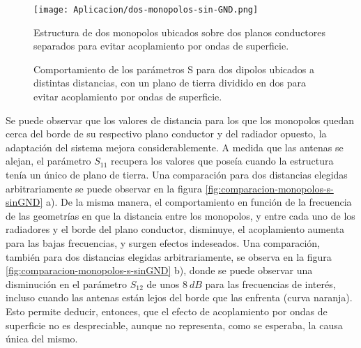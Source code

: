\begin{figure}[h]
	\centering
	\texttt{[image: Aplicacion/dos-monopolos-sin-GND.png]}
	\caption{Estructura de dos monopolos ubicados sobre dos planos conductores separados para evitar acoplamiento por ondas de superficie.}
	\label{fig:monopolos-sin-plano-de-tierra-geometria}
\end{figure}

\begin{figure}[h]
	\centering 
	\hspace{0pt}
	\caption{Comportamiento de los parámetros S para dos dipolos ubicados a distintas distancias, con un plano de tierra dividido en dos para evitar acoplamiento por ondas de superficie.}
	\label{fig:monopolos-sin-plano-de-tierra-resultados}	
\end{figure}  

Se puede observar que los valores de distancia para los que los monopolos quedan cerca del borde de su respectivo plano conductor y del radiador opuesto, la adaptación del sistema mejora considerablemente. A medida que las antenas se alejan, el parámetro $S_{11}$ recupera los valores que poseía cuando la estructura tenía un único de plano de tierra. Una comparación para dos distancias elegidas arbitrariamente se puede observar en la figura \ref{fig:comparacion-monopolos-s-sinGND} a). De la misma manera, el comportamiento en función de la frecuencia de las geometrías en que la distancia entre los monopolos, y entre cada uno de los radiadores y el borde del plano conductor, disminuye, el acoplamiento aumenta para las bajas frecuencias, y surgen efectos indeseados. Una comparación, también para dos distancias elegidas arbitrariamente, se observa en la figura \ref{fig:comparacion-monopolos-s-sinGND} b), donde se puede observar una disminución en el parámetro $S_{12}$ de unos $8\ dB$ para las frecuencias de interés, incluso cuando las antenas están lejos del borde que las enfrenta (curva naranja). Esto permite deducir, entonces, que el efecto de acoplamiento por ondas de superficie no es despreciable, aunque no representa, como se esperaba, la causa única del mismo.



